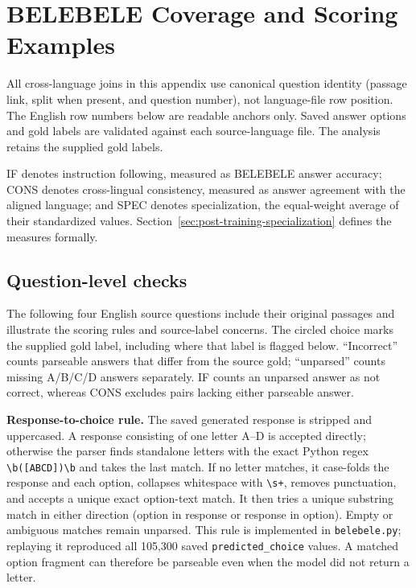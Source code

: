 \chapter{BELEBELE Coverage and Scoring Examples}
\label{app:belebele-scoring-examples}

All cross-language joins in this appendix use canonical question identity (passage link, split when present, and question number), not language-file row position. The English row numbers below are readable anchors only. Saved answer options and gold labels are validated against each source-language file. The analysis retains the supplied gold labels.

IF denotes instruction following, measured as BELEBELE answer accuracy; CONS denotes cross-lingual consistency, measured as answer agreement with the aligned language; and SPEC denotes specialization, the equal-weight average of their standardized values. Section~\ref{sec:post-training-specialization} defines the measures formally.

\section{Question-level checks}
The following four English source questions include their original passages and illustrate the scoring rules and source-label concerns. The circled choice marks the supplied gold label, including where that label is flagged below. ``Incorrect'' counts parseable answers that differ from the source gold; ``unparsed'' counts missing A/B/C/D answers separately. IF counts an unparsed answer as not correct, whereas CONS excludes pairs lacking either parseable answer.

\medskip\noindent\textbf{Response-to-choice rule.} The saved generated response is stripped and uppercased. A response consisting of one letter A--D is accepted directly; otherwise the parser finds standalone letters with the exact Python regex \verb|\b([ABCD])\b| and takes the last match. If no letter matches, it case-folds the response and each option, collapses whitespace with \verb|\s+|, removes punctuation, and accepts a unique exact option-text match. It then tries a unique substring match in either direction (option in response or response in option). Empty or ambiguous matches remain unparsed. This rule is implemented in \texttt{belebele.py}; replaying it reproduced all 105,300 saved \texttt{predicted\_choice} values. A matched option fragment can therefore be parseable even when the model did not return a letter.


